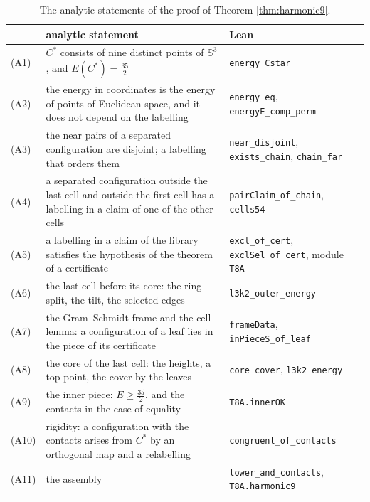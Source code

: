 \documentclass[reqno,a4paper,11pt]{amsart}
\numberwithin{equation}{section}
\newcommand{\Sph}{\mathbb{S}}
\newcommand{\lean}[1]{\texttt{#1}}
\begin{document}
\begin{table}[ht]
\centering
\small
\begin{tabular}{@{}lp{}p{}@{}}
\toprule
 & analytic statement & Lean \\
\midrule
(A1) & $C^*$ consists of nine distinct points of $\Sph^3$, and $E(C^*) = \tfrac{35}{2}$ & \lean{energy\_Cstar} \\
(A2) & the energy in coordinates is the energy of points of Euclidean space, and it does not depend on the labelling & \lean{energy\_eq}, \newline \lean{energyE\_comp\_perm} \\
(A3) & the near pairs of a separated configuration are disjoint; a labelling that orders them & \lean{near\_disjoint}, \newline \lean{exists\_chain}, \lean{chain\_far} \\
(A4) & a separated configuration outside the last cell and outside the first cell has a labelling in a claim of one of the other cells & \lean{pairClaim\_of\_chain}, \newline \lean{cells54} \\
(A5) & a labelling in a claim of the library satisfies the hypothesis of the theorem of a certificate & \lean{excl\_of\_cert}, \newline \lean{exclSel\_of\_cert}, \newline module \lean{T8A} \\
(A6) & the last cell before its core: the ring split, the tilt, the selected edges & \lean{l3k2\_outer\_energy} \\
(A7) & the Gram--Schmidt frame and the cell lemma: a configuration of a leaf lies in the piece of its certificate & \lean{frameData}, \newline \lean{inPieceS\_of\_leaf} \\
(A8) & the core of the last cell: the heights, a top point, the cover by the leaves & \lean{core\_cover}, \newline \lean{l3k2\_energy} \\
(A9) & the inner piece: $E \geq \tfrac{35}{2}$, and the contacts in the case of equality & \lean{T8A.innerOK} \\
(A10) & rigidity: a configuration with the contacts arises from $C^*$ by an orthogonal map and a relabelling & \lean{congruent\_of\_contacts} \\
(A11) & the assembly & \lean{lower\_and\_contacts}, \newline \lean{T8A.harmonic9} \\
\bottomrule
\end{tabular}
\medskip
\caption{The analytic statements of the proof of Theorem \ref{thm:harmonic9}.}\label{tab:s3n9an}
\end{table}
\end{document}
